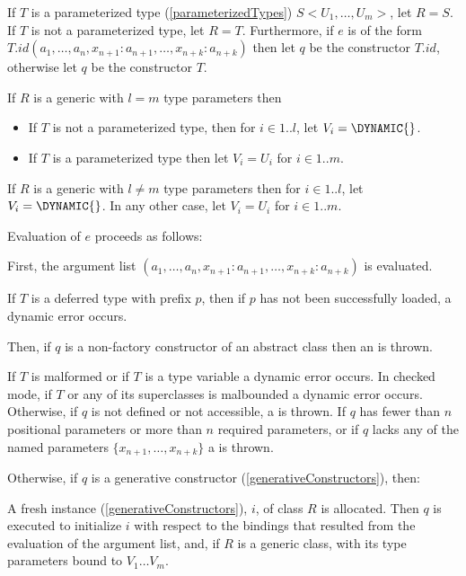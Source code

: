 \documentclass{article}
\begin{document}
\LMHash{}
If $T$ is a parameterized type (\ref{parameterizedTypes}) $S<U_1, \ldots, U_m>$, let $R = S$.
If $T$ is not a parameterized type, let $R = T$.
Furthermore, if $e$ is of the form \NEW{} $T.id(a_1, \ldots , a_n, x_{n+1}: a_{n+1}, \ldots , x_{n+k}: a_{n+k})$ then let $q$ be the constructor $T.id$, otherwise let $q$ be the constructor $T$.

\LMHash{}
If $R$ is a generic with $l = m$ type parameters then
\begin{itemize}
\item If $T$ is not a parameterized type, then for $ i \in 1 .. l$, let $V_i = \DYNAMIC{}$.
\item If $T$ is a parameterized type then let $V_i = U_i$ for $ i \in 1 .. m$.
\end{itemize}

\LMHash{}
If $R$ is a generic with $l \ne m$ type parameters then for $ i \in 1 .. l$, let $V_i = \DYNAMIC{}$.
In any other case, let $V_i = U_i$ for $ i \in 1 .. m$.

\LMHash{}
Evaluation of $e$ proceeds as follows:

\LMHash{}
First, the argument list $(a_1, \ldots , a_n, x_{n+1}: a_{n+1}, \ldots , x_{n+k}: a_{n+k})$ is evaluated.

\LMHash{}
If $T$ is a deferred type with prefix $p$, then if $p$ has not been successfully loaded, a dynamic error occurs.

\LMHash{}
Then, if $q$ is a non-factory constructor of an abstract class then an  is thrown.

\LMHash{}
If $T$ is malformed or if $T$ is a type variable a dynamic error occurs.
In checked mode, if $T$ or any of its superclasses is malbounded a dynamic error occurs.
Otherwise, if $q$ is not defined or not accessible, a  is thrown.
If $q$ has fewer than $n$ positional parameters or more than $n$ required parameters,
or if $q$ lacks any of the named parameters $\{ x_{n+1}, \ldots, x_{n+k}\}$ a  is thrown.

\LMHash{}
Otherwise, if $q$ is a generative constructor (\ref{generativeConstructors}), then:


\LMHash{}
A fresh instance (\ref{generativeConstructors}), $i$, of class $R$ is allocated.
Then $q$ is executed to initialize $i$ with respect to the bindings that resulted from the evaluation of the argument list, and, if $R$ is a generic class, with its type parameters bound to $V_1 \ldots V_m$.
\end{document}
